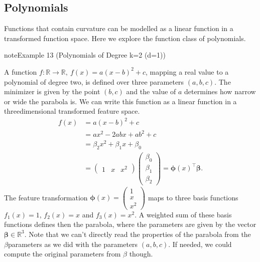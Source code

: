 \documentclass[letterpaper,10pt,english]{jupyterBook}
\begin{document}
\subsection{Polynomials}
\label{\detokenize{regression_functions:polynomials}}
\sphinxAtStartPar
Functions that contain curvature can be modelled as a linear function in a transformed function space. Here we explore the function class of polynomials.
\label{regression_functions:example-2}
\begin{sphinxadmonition}{note}{Example 13 (Polynomials of Degree k=2 (d=1))}


\begin{center}\end{center}
\sphinxAtStartPar
A function \(f:\mathbb{R}\rightarrow\mathbb{R},\ f(x)= a(x-b)^2+c\), mapping a real value to a polynomial of degree two, is defined over three parameters \((a,b,c)\). The minimizer is given by the point \((b,c)\) and the value of \(a\) determines how narrow or wide the parabola is. We can write this function as a linear function in a three\sphinxhyphen{}dimensional transformed feature space.
\begin{align*} 
    f(x)&= a(x-b)^2+c\\
    &=ax^2 -2abx+ab^2+c\\
    &=\beta_2x^2+\beta_1x+ \beta_0\\
    &= 
    \begin{pmatrix} 
        1&x& x^2
    \end{pmatrix}
    \begin{pmatrix}
        \beta_0 \\ \beta_1 \\ \beta_2
    \end{pmatrix}= \bm{\phi}(x)^\top\bm{\beta}.
\end{align*}
\sphinxAtStartPar
The feature transformation \(\bm{\phi}(x)=\begin{pmatrix}1\\ x\\ x^2\end{pmatrix}\) maps to three basis functions \(f_1(x)=1\), \(f_2(x)=x\) and \(f_3(x)=x^2\). A weighted sum of these basis functions defines then the parabola, where the parameters are given by the vector \(\bm\beta\in\mathbb{R}^{3}\). Note that we can’t directly read the properties of the parabola from the \(\beta\)\sphinxhyphen{}parameters as we did with the parameters \((a,b,c)\). If needed, we could compute the original parameters from \(\beta\) though.
\end{sphinxadmonition}
\end{document}
